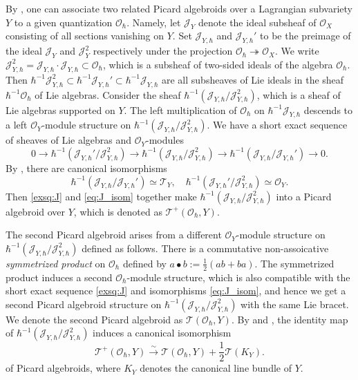 \documentclass[12pt]{amsart}
\newcommand{\J}{\mathcal{J}}
\newcommand{\T}{\mathcal{T}}
\newcommand{\TT}{\mathscr{T}}
\newcommand{\tatp}{\TT^+(\Q, Y)}
\newcommand{\tat}{\TT(\Q,Y)}
\newcommand{\OO}{\mathcal{O}}
\newcommand{\Q}{\OO_\hbar}
\theoremstyle{definition}
\numberwithin{equation}{section}
\begin{document}
By \cite[\S\,4.1]{LY}, one can associate two related Picard algebroids over a Lagrangian subvariety $Y$ to a given quantization $\OO_\hbar$. Namely, let $\J_Y$ denote the ideal subsheaf of $\OO_X$ consisting of all
sections vanishing on $Y$. Set $\J_{Y,\hbar}$ and $\J_{Y,\hbar}'$ to be the preimage of the ideal $\J_Y$ and $\J_Y^2$ respectively under the projection $\OO_\hbar \twoheadrightarrow \OO_X$. We write $\J_{Y,\hbar}^2 = \J_{Y,\hbar} \cdot \J_{Y,\hbar} \subset \OO_\hbar$, which is a subsheaf of two-sided ideals of the algebra $\OO_\hbar$. Then $\hbar^{-1} \J_{Y,\hbar}^2 \subset \hbar^{-1}\J_{Y,\hbar}' \subset \hbar^{-1}\J_{Y,\hbar}$ are all subsheaves of Lie ideals in the sheaf $ \hbar^{-1}\OO_\hbar$ of Lie algebras. Consider the sheaf $\hbar^{-1} (\J_{Y,\hbar}/\J_{Y,\hbar}^2)$, which is a sheaf of Lie algebras supported on $Y$. The left multiplication of $\OO_\hbar$ on $\hbar^{-1}\J_{Y,\hbar}$ descends to a left $\OO_Y$-module structure on $\hbar^{-1} (\J_{Y,\hbar}/ \J_{Y,\hbar}^2)$. We have a short exact sequence of sheaves of Lie algebras and $\OO_Y$-modules
\begin{equation}\label{exsq:J}
	0 \to \hbar^{-1} (\J_{Y,\hbar}' / \J_{Y,\hbar}^2) \to \hbar^{-1} (\J_{Y,\hbar}/ \J_{Y,\hbar}^2) \to \hbar^{-1} (\J_{Y,\hbar} / \J_{Y,\hbar}') \to 0.
\end{equation}
By \cite[Lemma 5.4]{BGKP}, there are canonical isomorphisms
\begin{equation} \label{eq:J_isom}
	\hbar^{-1} (\J_{Y,\hbar} / \J_{Y,\hbar}') \simeq \T_Y, \quad \hbar^{-1} (\J_{Y,\hbar}' / \J_{Y,\hbar}^2) \simeq \OO_Y.
\end{equation}
Then  \eqref{exsq:J} and \eqref{eq:J_isom} together make $\hbar^{-1} (\J_{Y,\hbar}/ \J_{Y,\hbar}^2)$ into a Picard algebroid over $Y$, which is denoted as $\tatp$.

The second Picard algebroid arises from a different $\OO_Y$-module structure on $\hbar^{-1} (\J_{Y,\hbar}/ \J_{Y,\hbar}^2)$ defined as follows. There is a commutative non-assoicative \emph{symmetrized product} on $\OO_\hbar$ defined by $a \bullet b := \frac{1}{2}(a b + b a)$. The symmetrized product induces a second $\OO_\hbar$-module structure, which is also compatible with the short exact sequence \eqref{exsq:J} and isomorphisms \eqref{eq:J_isom},  and hence we get a second Picard algebroid structure on $\hbar^{-1} (\J_{Y,\hbar}/ \J_{Y,\hbar}^2)$ with the same Lie bracet. We denote the second Picard algebroid as $\tat$. By \cite[Section 1]{BC} and \cite[Section 4.1]{LY},  the identity map of $\hbar^{-1} (\J_{Y,\hbar}/ \J_{Y,\hbar}^2)$ induces a canonical isomorphism
\begin{equation}\label{eq:tatp2tat}
	\tatp \xrightarrow{\sim} \tat + \frac{1}{2}\TT(K_Y).
\end{equation}
of Picard algebroids, where $K_Y$ denotes the canonical line bundle of $Y$.
\end{document}
